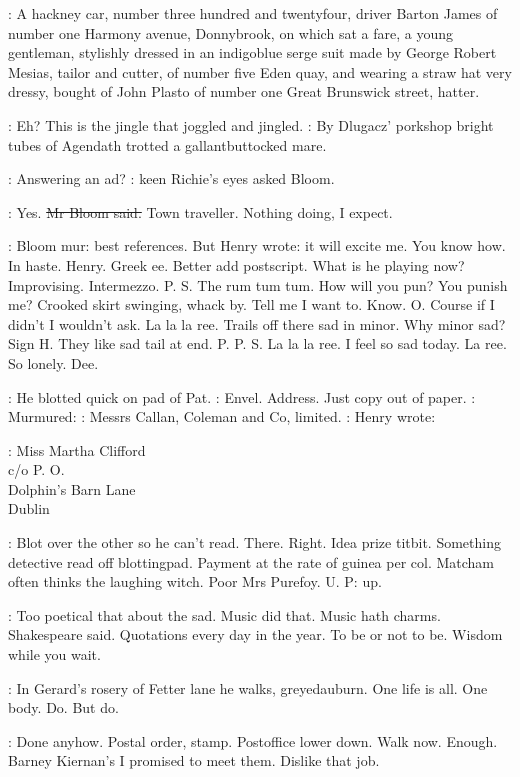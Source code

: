 :
A hackney car,
number three hundred and twentyfour,
driver Barton James of
number one Harmony avenue,
Donnybrook,
on which sat a fare,
a young gentleman,
stylishly dressed in an indigoblue serge suit made by
George Robert Mesias,
tailor and cutter,
of number five Eden quay,
and
wearing a straw hat very dressy,
bought of John Plasto of number one
Great Brunswick street,
hatter.

\BloomInt:
Eh?
This is the jingle that joggled and jingled.
:
By Dlugacz' porkshop bright tubes of Agendath trotted a
gallantbuttocked mare.

\goulding:
Answering an ad?
:
keen Richie's eyes asked Bloom.

\Bloom:
Yes.
\sout{Mr Bloom said.}
Town traveller.
Nothing doing,
I expect.

\BloomInt:
Bloom mur:
best references.
But Henry wrote:
it will excite me.
You
know how.
In haste.
Henry.
Greek ee.
Better add postscript.
What is he
playing now?
Improvising.
Intermezzo.
P.
S.
The rum tum tum.
How will
you pun?
You punish me?
Crooked skirt swinging,
whack by.
Tell me I want
to.
Know.
O.
Course if I didn't I wouldn't ask.
La la la ree.
Trails off
there sad in minor.
Why minor sad?
Sign H.
They like sad tail at end.
P.
P.
S.
La la la ree.
I feel so sad today.
La ree.
So lonely.
Dee.

:
He blotted quick on pad of Pat.
\BloomInt:
Envel.
Address.
Just copy out of paper.
:
Murmured:
\BloomInt:
Messrs Callan,
Coleman and Co,
limited.
:
Henry wrote:

:
        Miss Martha Clifford\\
            c/o P.
O.\\
                Dolphin's Barn Lane\\
                     Dublin

\BloomInt:
Blot over the other so he can't read.
There.
Right.
Idea prize titbit.
Something detective read off blottingpad.
Payment at the rate of guinea
per col.
Matcham often thinks the laughing witch.
Poor Mrs Purefoy.
U.
P:
up.

\BloomInt:
Too poetical that about the sad.
Music did that.
Music hath charms.
Shakespeare said.
Quotations every day in the year.
To be or not to be.
Wisdom while you wait.

\BloomInt:
In Gerard's rosery of Fetter lane he walks,
greyedauburn.
One life is
all.
One body.
Do.
But do.

\BloomInt:
Done anyhow.
Postal order,
stamp.
Postoffice lower down.
Walk
now.
Enough.
Barney Kiernan's I promised to meet them.
Dislike that job.

